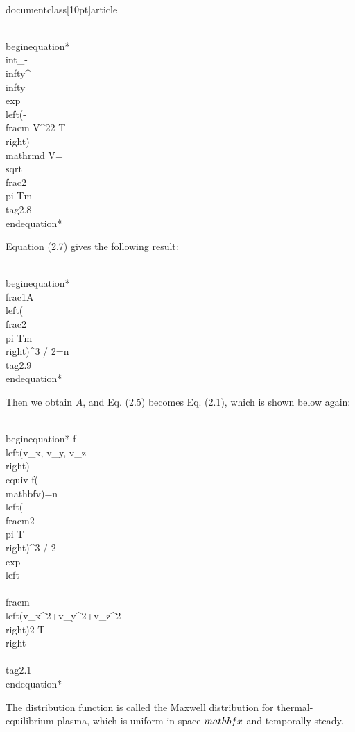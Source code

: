 \\documentclass[10pt]{article}
\begin{document}
\\begin{equation*}
\\int_{-\\infty}^{\\infty} \\exp \\left(-\\frac{m V^{2}}{2 T}\\right) \\mathrm{d} V=\\sqrt{\\frac{2 \\pi T}{m}} \\tag{2.8}
\\end{equation*}


Equation (2.7) gives the following result:


\\begin{equation*}
\\frac{1}{A}\\left(\\frac{2 \\pi T}{m}\\right)^{3 / 2}=n \\tag{2.9}
\\end{equation*}


Then we obtain $A$, and Eq. (2.5) becomes Eq. (2.1), which is shown below again:


\\begin{equation*}
f\\left(v_{x}, v_{y}, v_{z}\\right) \\equiv f(\\mathbf{v})=n\\left(\\frac{m}{2 \\pi T}\\right)^{3 / 2} \\exp \\left\\{-\\frac{m\\left(v_{x}^{2}+v_{y}^{2}+v_{z}^{2}\\right)}{2 T}\\right\\} \\tag{2.1}
\\end{equation*}


The distribution function is called the Maxwell distribution for thermal-equilibrium plasma, which is uniform in space $\\mathbf{x}$ and temporally steady.
\end{document}
